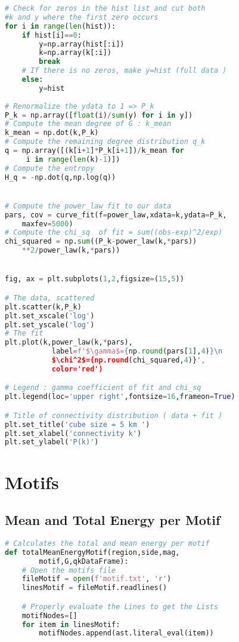 \documentclass[12pt, twoside]{report}
\begin{document}
\begin{appendices}
\begin{lstlisting}[language=python, frame=single, tabsize=1]
# Check for zeros in the hist list and cut both 
#k and y where the first zero occurs
for i in range(len(hist)):
	if hist[i]==0:
		y=np.array(hist[:i])
		k=np.array(k[:i])
		break
	# If there is no zeros, make y=hist (full data )
	else:
		y=hist
		
# Renormalize the ydata to 1 => P_k
P_k = np.array([float(i)/sum(y) for i in y])
# Compute the mean degree of G : k_mean
k_mean = np.dot(k,P_k)
# Compute the remaining degree distribution q_k
q = np.array([(k[i+1]*P_k[i+1])/k_mean for
	 i in range(len(k)-1)])
# Compute the entropy
H_q = -np.dot(q,np.log(q))


# Compute the power_law fit to our data 
pars, cov = curve_fit(f=power_law,xdata=k,ydata=P_k,
	maxfev=5000)
# Compute the chi_sq  of fit = sum((obs-exp)^2/exp)
chi_squared = np.sum((P_k-power_law(k,*pars))
	**2/power_law(k,*pars))


fig, ax = plt.subplots(1,2,figsize=(15,5))

# The data, scattered
plt.scatter(k,P_k)
plt.set_xscale('log')
plt.set_yscale('log')
# The fit
plt.plot(k,power_law(k,*pars),
		   label=f'$\gamma$={np.round(pars[1],4)}\n
		   $\chi^2$={np.round(chi_squared,4)}',
		   color='red')

# Legend : gamma coefficient of fit and chi_sq
plt.legend(loc='upper right',fontsize=16,frameon=True)

# Title of connectivity distribution ( data + fit )
plt.set_title('cube size = 5 km ')
plt.set_xlabel('connectivity k')
plt.set_ylabel('P(k)')
\end{lstlisting}



\chapter{Motifs}
\section{Mean and Total Energy per Motif }

\begin{lstlisting}[language=python, frame=single, tabsize=1] 
# Calculates the total and mean energy per motif
def totalMeanEnergyMotif(region,side,mag,
		motif,G,qkDataFrame):
    # Open the motifs file
    fileMotif = open(f'motif.txt', 'r')
    linesMotif = fileMotif.readlines()

    # Properly evaluate the Lines to get the Lists
    motifNodes=[]
    for item in linesMotif:
        motifNodes.append(ast.literal_eval(item))



\end{lstlisting}
\end{appendices}
\end{document}
